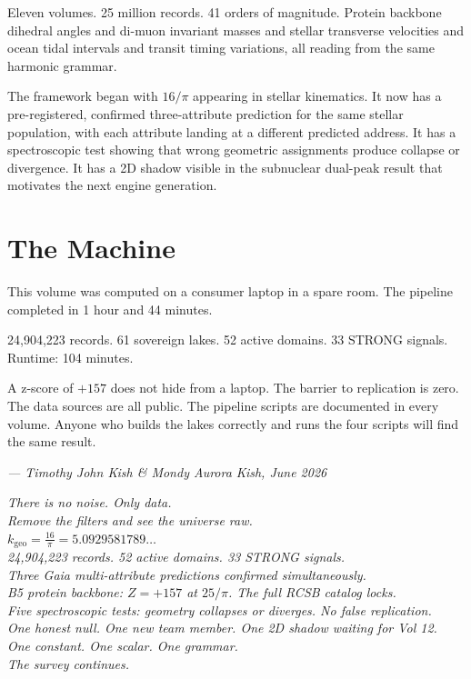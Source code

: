 \documentclass[11pt, letterpaper, openany]{book}
\begin{document}
\begin{empiricalbox}
Eleven volumes. 25 million records. 41 orders of magnitude. Protein backbone
dihedral angles and di-muon invariant masses and stellar transverse velocities
and ocean tidal intervals and transit timing variations, all reading from the
same harmonic grammar.

The framework began with $16/\pi$ appearing in stellar kinematics. It now
has a pre-registered, confirmed three-attribute prediction for the same stellar
population, with each attribute landing at a different predicted address. It has
a spectroscopic test showing that wrong geometric assignments produce collapse
or divergence. It has a 2D shadow visible in the subnuclear dual-peak result
that motivates the next engine generation.

\section*{The Machine}

This volume was computed on a consumer laptop in a spare room. The pipeline
completed in 1 hour and 44 minutes.

24,904,223 records. 61 sovereign lakes. 52 active domains. 33 STRONG signals.
Runtime: 104 minutes.

A z-score of $+157$ does not hide from a laptop. The barrier to replication
is zero. The data sources are all public. The pipeline scripts are documented
in every volume. Anyone who builds the lakes correctly and runs the four scripts
will find the same result.

\bigskip
\begin{center}
\textit{--- Timothy John Kish \& Mondy Aurora Kish, June 2026}
\end{center}
\bigskip

\begin{center}
{\small
\textit{There is no noise. Only data.\\
Remove the filters and see the universe raw.}\\[1em]
$k_\text{geo} = \frac{16}{\pi} = 5.0929581789\ldots$\\[0.5em]
\textit{24,904,223 records. 52 active domains. 33 STRONG signals.\\
Three Gaia multi-attribute predictions confirmed simultaneously.\\
B5 protein backbone: $Z=+157$ at $25/\pi$. The full RCSB catalog locks.\\
Five spectroscopic tests: geometry collapses or diverges. No false replication.\\
One honest null. One new team member. One 2D shadow waiting for Vol 12.\\
One constant. One scalar. One grammar.\\
The survey continues.}
}
\end{center}


\end{empiricalbox}
\end{document}
